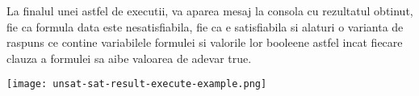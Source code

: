 La finalul unei astfel de executii, va aparea mesaj la consola cu rezultatul obtinut, fie ca formula data este nesatisfiabila, fie ca e satisfiabila si alaturi o varianta de raspuns ce contine variabilele formulei si valorile lor booleene astfel incat fiecare clauza a formulei sa aibe valoarea de adevar true.
\newline

\texttt{[image: unsat-sat-result-execute-example.png]}

